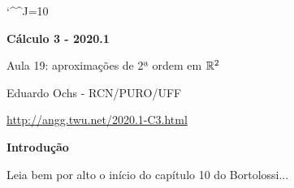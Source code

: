 \documentclass[oneside,12pt]{article}
\begin{document}
\catcode`\^^J=10

\long{}
\long{}
\long{}
\long{}
\long{}
\long{}
\long{}
\long{}
\long{}
\long{}

\long{}
\long{}

\def\frown{\ensuremath{{=}{(}}}
\def\True {\mathbf{V}}
\def\False{\mathbf{F}}

\def\drafturl{http://angg.twu.net/LATEX/2020-1-C2.pdf}
\def\drafturl{http://angg.twu.net/2020.1-C2.html}
\def\draftfooter{\tiny \href{\drafturl}{\jobname{}} \ColorBrown{\shorttoday{} \hours}}


%

\thispagestyle{empty}

\begin{center}

\vspace*{1.2cm}

{\bf \Large Cálculo 3 - 2020.1}

\bsk

Aula 19: aproximações de 2ª ordem em $\mathbb{R}^2$

\bsk

Eduardo Ochs - RCN/PURO/UFF

\url{http://angg.twu.net/2020.1-C3.html}

\end{center}

\newpage

{\bf Introdução}

\ssk

Leia bem por alto o início do capítulo 10 do Bortolossi...
\end{document}
